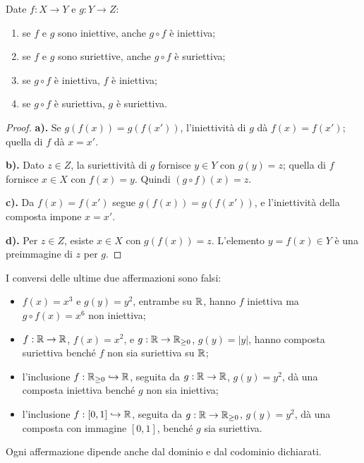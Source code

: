 \begin{proposizione}\label{prop:composte}
Date $f:X\to Y$ e $g:Y\to Z$:
\begin{enumerate}[label=\alph*)]
  \item se $f$ e $g$ sono iniettive, anche $g\circ f$ è iniettiva;
  \item se $f$ e $g$ sono suriettive, anche $g\circ f$ è suriettiva;
  \item se $g\circ f$ è iniettiva, $f$ è iniettiva;
  \item se $g\circ f$ è suriettiva, $g$ è suriettiva.
\end{enumerate}
\end{proposizione}
\begin{proof}
\textbf{a).} Se $g(f(x))=g(f(x'))$, l'iniettività di $g$ dà $f(x)=f(x')$; quella di $f$ dà $x=x'$.

\textbf{b).} Dato $z\in Z$, la suriettività di $g$ fornisce $y\in Y$ con $g(y)=z$; quella di $f$ fornisce $x\in X$ con $f(x)=y$. Quindi $(g\circ f)(x)=z$.

\textbf{c).} Da $f(x)=f(x')$ segue $g(f(x))=g(f(x'))$, e l'iniettività della composta impone $x=x'$.

\textbf{d).} Per $z\in Z$, esiste $x\in X$ con $g(f(x))=z$. L'elemento $y=f(x)\in Y$ è una preimmagine di $z$ per $g$.
\end{proof}

\begin{esempio}
I conversi delle ultime due affermazioni sono falsi:
\begin{itemize}
  \item $f(x)=x^3$ e $g(y)=y^2$, entrambe su $\mathbb{R}$, hanno $f$ iniettiva ma $g\circ f(x)=x^6$ non iniettiva;
  \item $f:\mathbb{R}\to\mathbb{R}$, $f(x)=x^2$, e $g:\mathbb{R}\to\mathbb{R}_{\ge0}$, $g(y)=|y|$, hanno composta suriettiva benché $f$ non sia suriettiva su $\mathbb{R}$;
  \item l'inclusione $f:\mathbb{R}_{\ge0}\hookrightarrow\mathbb{R}$, seguita da $g:\mathbb{R}\to\mathbb{R}$, $g(y)=y^2$, dà una composta iniettiva benché $g$ non sia iniettiva;
  \item l'inclusione $f:[0,1]\hookrightarrow\mathbb{R}$, seguita da $g:\mathbb{R}\to\mathbb{R}_{\ge0}$, $g(y)=y^2$, dà una composta con immagine $[0,1]$, benché $g$ sia suriettiva.
\end{itemize}
Ogni affermazione dipende anche dal dominio e dal codominio dichiarati.
\end{esempio}


